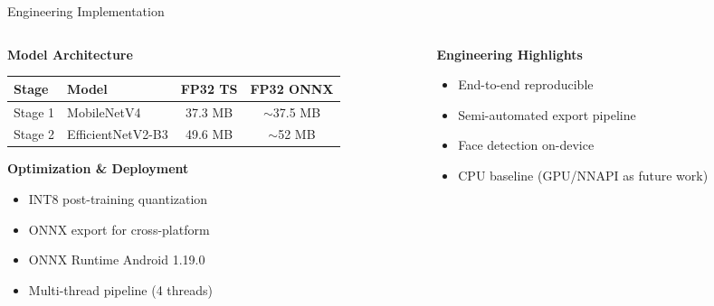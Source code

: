 \documentclass[aspectratio=169,12pt]{beamer}
\begin{document}
\begin{frame}{Engineering Implementation}
\begin{columns}[T]
\begin{column}{0.5\textwidth}
\textbf{Model Architecture}
\begin{center}
\scriptsize
\begin{tabular}{llcc}
\toprule
\textbf{Stage} & \textbf{Model} & \textbf{FP32 TS} & \textbf{FP32 ONNX} \\
\midrule
Stage 1 & MobileNetV4 & 37.3 MB & $\sim$37.5 MB \\
Stage 2 & EfficientNetV2-B3 & 49.6 MB & $\sim$52 MB \\
\bottomrule
\end{tabular}
\end{center}

\vspace{0.5em}
\textbf{Optimization \& Deployment}
\begin{itemize}
    \item INT8 post-training quantization
    \item ONNX export for cross-platform
    \item ONNX Runtime Android 1.19.0
    \item Multi-thread pipeline (4 threads)
\end{itemize}
\end{column}

\begin{column}{0.5\textwidth}
\textbf{Engineering Highlights}
\begin{itemize}
    \item End-to-end reproducible
    \item Semi-automated export pipeline
    \item Face detection on-device
    \item CPU baseline (GPU/NNAPI as future work)
\end{itemize}

\vspace{0.5em}
\end{column}
\end{columns}
\end{frame}
\end{document}
